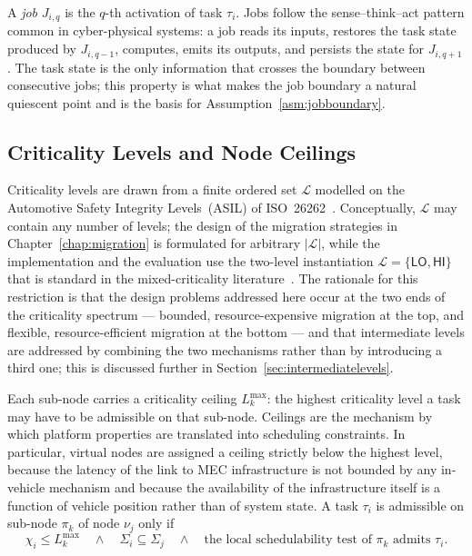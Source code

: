 A \emph{job} $J_{i,q}$ is the $q$-th activation of task $\tau_i$. Jobs follow
the sense--think--act pattern common in cyber-physical systems: a job reads
its inputs, restores the task state produced by $J_{i,q-1}$, computes, emits
its outputs, and persists the state for $J_{i,q+1}$. The task state is the
only information that crosses the boundary between consecutive jobs; this
property is what makes the job boundary a natural quiescent point and is the
basis for Assumption~\ref{asm:jobboundary}.

\subsection{Criticality Levels and Node Ceilings}\label{subsec:criticalitymodel}

Criticality levels are drawn from a finite ordered set $\mathcal{L}$ modelled
on the Automotive Safety Integrity Levels~(ASIL) of
ISO~26262~\parencite{iso26262_2018}. Conceptually, $\mathcal{L}$ may contain
any number of levels; the design of the migration strategies in
Chapter~\ref{chap:migration} is formulated for arbitrary $|\mathcal{L}|$,
while the implementation and the evaluation use the two-level instantiation
$\mathcal{L} = \{\textsf{LO}, \textsf{HI}\}$ that is standard in the
mixed-criticality literature~\parencite{burns2017}. The rationale for this
restriction is that the design problems addressed here occur at the two ends
of the criticality spectrum --- bounded, resource-expensive migration at the
top, and flexible, resource-efficient migration at the bottom --- and that
intermediate levels are addressed by combining the two mechanisms rather than
by introducing a third one; this is discussed further in
Section~\ref{sec:intermediatelevels}.

Each sub-node carries a criticality ceiling $L_k^{\max}$: the highest
criticality level a task may have to be admissible on that sub-node. Ceilings are the
mechanism by which platform properties are translated into scheduling
constraints. In particular, virtual nodes are assigned a ceiling strictly
below the highest level, because the latency of the link to MEC
infrastructure is not bounded by any in-vehicle mechanism and because the
availability of the infrastructure itself is a function of vehicle position
rather than of system state. A task $\tau_i$ is admissible on sub-node
$\pi_k$ of node $\nu_j$ only if
%
\begin{equation}\label{eq:admissibility}
	\chi_i \leq L_k^{\max}
	\quad\wedge\quad
	\Sigma_i \subseteq \Sigma_j
	\quad\wedge\quad
	\text{the local schedulability test of $\pi_k$ admits $\tau_i$.}
\end{equation}

